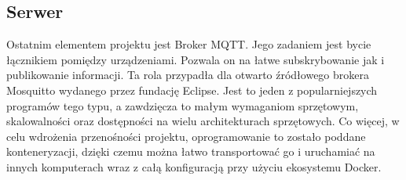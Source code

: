         \subsection{Serwer}
            Ostatnim elementem projektu jest Broker MQTT. Jego zadaniem jest bycie łącznikiem pomiędzy urządzeniami. Pozwala on na łatwe subskrybowanie jak i publikowanie informacji. Ta rola przypadła dla otwarto źródłowego brokera Mosquitto wydanego przez fundację Eclipse. Jest to jeden z popularniejszych programów tego typu, a zawdzięcza to małym wymaganiom sprzętowym, skalowalności oraz
            dostępności na wielu architekturach sprzętowych. Co więcej, w celu wdrożenia
            przenośności projektu, oprogramowanie to zostało poddane konteneryzacji,
            dzięki czemu można łatwo transportować go i uruchamiać na innych komputerach wraz z całą konfiguracją przy użyciu ekosystemu Docker.
